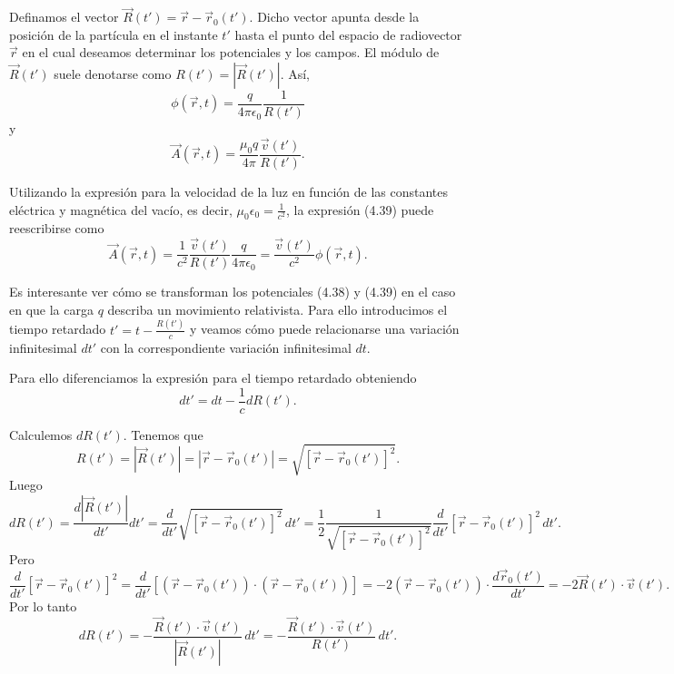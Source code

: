 \documentclass[12pt,a4paper]{book}
\begin{document}
Definamos el vector $\vec{R}(t') = \vec{r} - \vec{r}_0(t')$. Dicho vector apunta desde la posición de la partícula en el instante $t'$ hasta el punto del espacio de radiovector $\vec{r}$ en el cual deseamos determinar los potenciales y los campos. El módulo de $\vec{R}(t')$ suele denotarse como $R(t') = |\vec{R}(t')|$. Así,
\begin{equation}
\phi(\vec{r}, t) = \frac{q}{4\pi\epsilon_0}\frac{1}{R(t')}
\end{equation}
y
\begin{equation}
\vec{A}(\vec{r}, t) = \frac{\mu_0 q}{4\pi}\frac{\vec{v}(t')}{R(t')}.
\end{equation}

Utilizando la expresión para la velocidad de la luz en función de las constantes eléctrica y magnética del vacío, es decir, $\mu_0\epsilon_0 = \frac{1}{c^2}$, la expresión (4.39) puede reescribirse como
\begin{equation}
\vec{A}(\vec{r}, t) = \frac{1}{c^2}\frac{\vec{v}(t')}{R(t')}\frac{q}{4\pi\epsilon_0} = \frac{\vec{v}(t')}{c^2}\phi(\vec{r}, t).
\end{equation}

Es interesante ver cómo se transforman los potenciales (4.38) y (4.39) en el caso en que la carga $q$ describa un movimiento relativista. Para ello introducimos el tiempo retardado $t' = t - \frac{R(t')}{c}$ y veamos cómo puede relacionarse una variación infinitesimal $dt'$ con la correspondiente variación infinitesimal $dt$.

Para ello diferenciamos la expresión para el tiempo retardado obteniendo
\begin{equation}
dt' = dt - \frac{1}{c}dR(t').
\end{equation}

Calculemos $dR(t')$. Tenemos que
\begin{equation}
R(t') = |\vec{R}(t')| = |\vec{r} - \vec{r}_0(t')| = \sqrt{[\vec{r} - \vec{r}_0(t')]^2}.
\end{equation}
Luego
\begin{equation}
dR(t') = \frac{d|\vec{R}(t')|}{dt'}dt' = \frac{d}{dt'}\sqrt{[\vec{r} - \vec{r}_0(t')]^2}\,dt' = \frac{1}{2}\frac{1}{\sqrt{[\vec{r} - \vec{r}_0(t')]^2}}\frac{d}{dt'}[\vec{r} - \vec{r}_0(t')]^2\,dt'.
\end{equation}
Pero
\begin{equation}
\frac{d}{dt'}[\vec{r} - \vec{r}_0(t')]^2 = \frac{d}{dt'}[(\vec{r} - \vec{r}_0(t')) \cdot (\vec{r} - \vec{r}_0(t'))] = -2(\vec{r} - \vec{r}_0(t')) \cdot \frac{d\vec{r}_0(t')}{dt'} = -2\vec{R}(t') \cdot \vec{v}(t').
\end{equation}
Por lo tanto
\begin{equation}
dR(t') = -\frac{\vec{R}(t') \cdot \vec{v}(t')}{|\vec{R}(t')|}\,dt' = -\frac{\vec{R}(t') \cdot \vec{v}(t')}{R(t')}\,dt'.
\end{equation}
\end{document}
